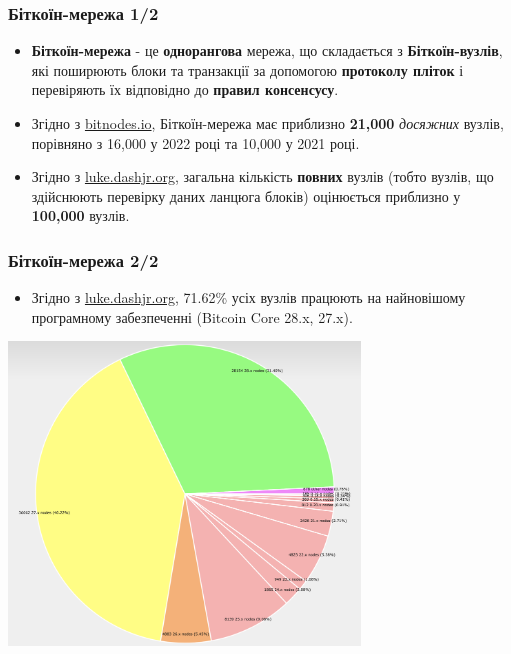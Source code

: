 \documentclass{beamer}
\begin{document}
\begin{frame}
  \frametitle{Біткоїн-мережа 1/2}
  \begin{itemize}
  \item \textbf{Біткоїн-мережа} - це \textbf{однорангова} мережа, що складається
    з \textbf{Біткоїн-вузлів}, які поширюють блоки та транзакції за допомогою
    \textbf{протоколу пліток} і перевіряють їх відповідно до \textbf{правил
      консенсусу}.
  \item Згідно з \href{https://bitnodes.io}{bitnodes.io}, Біткоїн-мережа має
    приблизно \textbf{21,000} \textit{досяжних} вузлів, порівняно з 16,000 у
    2022 році та 10,000 у 2021 році.
  \item Згідно з \href{https://luke.dashjr.org}{luke.dashjr.org}, загальна
    кількість \textbf{повних} вузлів (тобто вузлів, що здійснюють перевірку
    даних ланцюга блоків) оцінюється приблизно у \textbf{100,000} вузлів.
  \end{itemize}
\end{frame}

\begin{frame}
  \frametitle{Біткоїн-мережа 2/2}
  \begin{itemize}
  \item Згідно з \href{https://luke.dashjr.org}{luke.dashjr.org}, 71.62\% усіх
    вузлів працюють на найновішому програмному забезпеченні (Bitcoin Core 28.x,
    27.x).
  \end{itemize}
  \begin{center}
    \includegraphics[width=0.7\textwidth]{nodes}
  \end{center}
\end{frame}
\end{document}
